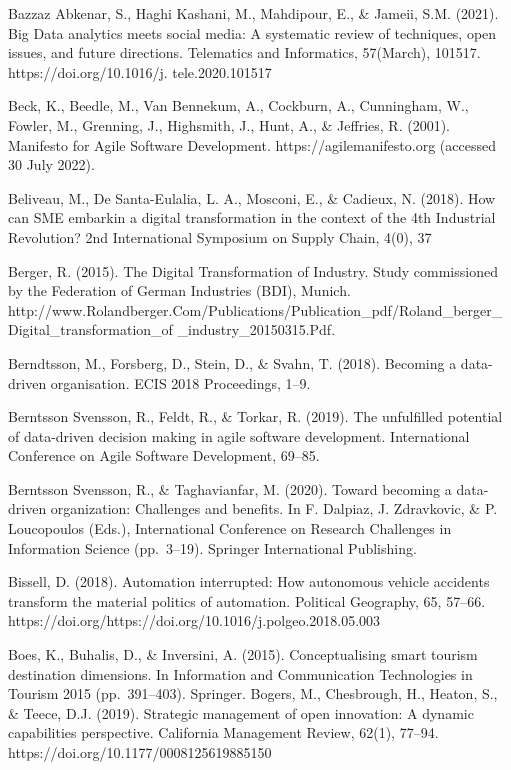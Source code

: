 \documentclass[
  letterpaper,
  DIV=11,
  numbers=noendperiod]{scrreprt}
\begin{document}
Bazzaz Abkenar, S., Haghi Kashani, M., Mahdipour, E., \& Jameii, S.M.
(2021). Big Data analytics meets social media: A systematic review of
techniques, open issues, and future directions. Telematics and
Informatics, 57(March), 101517. https://doi.org/10.1016/j.
tele.2020.101517

Beck, K., Beedle, M., Van Bennekum, A., Cockburn, A., Cunningham, W.,
Fowler, M., Grenning, J., Highsmith, J., Hunt, A., \& Jeffries, R.
(2001). Manifesto for Agile Software Development.
https://agilemanifesto.org (accessed 30 July 2022).

Beliveau, M., De Santa-Eulalia, L. A., Mosconi, E., \& Cadieux, N.
(2018). How can SME embarkin a digital transformation in the context of
the 4th Industrial Revolution? 2nd International Symposium on Supply
Chain, 4(0), 37

Berger, R. (2015). The Digital Transformation of Industry. Study
commissioned by the Federation of German Industries (BDI), Munich.
http://www.Rolandberger.Com/Publications/Publication\_pdf/Roland\_berger\_Digital\_transformation\_of
\_industry\_20150315.Pdf.

Berndtsson, M., Forsberg, D., Stein, D., \& Svahn, T. (2018). Becoming a
data-driven organisation. ECIS 2018 Proceedings, 1--9.

Berntsson Svensson, R., Feldt, R., \& Torkar, R. (2019). The unfulfilled
potential of data-driven decision making in agile software development.
International Conference on Agile Software Development, 69--85.

Berntsson Svensson, R., \& Taghavianfar, M. (2020). Toward becoming a
data-driven organization: Challenges and benefits. In F. Dalpiaz, J.
Zdravkovic, \& P. Loucopoulos (Eds.), International Conference on
Research Challenges in Information Science (pp.~3--19). Springer
International Publishing.

Bissell, D. (2018). Automation interrupted: How autonomous vehicle
accidents transform the material politics of automation. Political
Geography, 65, 57--66.
https://doi.org/https://doi.org/10.1016/j.polgeo.2018.05.003

Boes, K., Buhalis, D., \& Inversini, A. (2015). Conceptualising smart
tourism destination dimensions. In Information and Communication
Technologies in Tourism 2015 (pp.~391--403). Springer. Bogers, M.,
Chesbrough, H., Heaton, S., \& Teece, D.J. (2019). Strategic management
of open innovation: A dynamic capabilities perspective. California
Management Review, 62(1), 77--94.
https://doi.org/10.1177/0008125619885150
\end{document}
